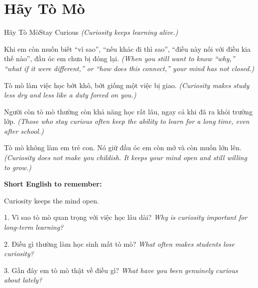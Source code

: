 \section{Hãy Tò Mò}
\begin{truyen}{Hãy Tò Mò}{Stay Curious}
\textit{(Curiosity keeps learning alive.)}

Khi em còn muốn biết “vì sao”, “nếu khác đi thì sao”, “điều này nối với điều kia thế nào”, đầu óc em chưa bị đóng lại.
\textit{(When you still want to know “why,” “what if it were different,” or “how does this connect,” your mind has not closed.)}

Tò mò làm việc học bớt khô, bớt giống một việc bị giao.
\textit{(Curiosity makes study less dry and less like a duty forced on you.)}

Người còn tò mò thường còn khả năng học rất lâu, ngay cả khi đã ra khỏi trường lớp.
\textit{(Those who stay curious often keep the ability to learn for a long time, even after school.)}
\end{truyen}

\begin{baihoc}
Tò mò không làm em trẻ con. Nó giữ đầu óc em còn mở và còn muốn lớn lên.
\textit{(Curiosity does not make you childish. It keeps your mind open and still willing to grow.)}
\end{baihoc}

\begin{ghinhoanh}
\textbf{Short English to remember:}

Curiosity keeps the mind open.

\end{ghinhoanh}

\begin{tuhocnhanh}
1. Vì sao tò mò quan trọng với việc học lâu dài? \textit{Why is curiosity important for long-term learning?}

2. Điều gì thường làm học sinh mất tò mò? \textit{What often makes students lose curiosity?}

3. Gần đây em tò mò thật về điều gì? \textit{What have you been genuinely curious about lately?}
\end{tuhocnhanh}
\ngancach

